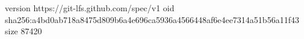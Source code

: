 version https://git-lfs.github.com/spec/v1
oid sha256:a4bd0ab718a8475d809b6a4e696ca5936a4566448af6e4ee7314a51b56a11f43
size 87420
